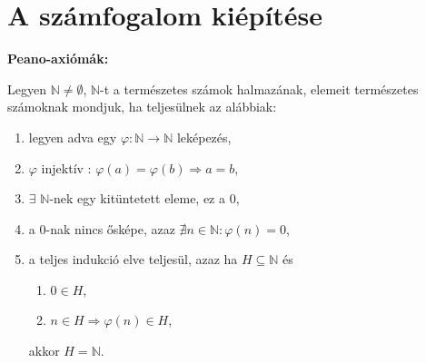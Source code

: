 \clearpage
\section{A számfogalom kiépítése}\label{sec-01-03}

\begin{blueBox}
  \bgroup
  \sffamily\bfseries Peano-axiómák:
  \egroup

  Legyen $ \mathbb N \neq \emptyset$, $\mathbb N$-t a természetes számok
  halmazának, elemeit természetes számoknak mondjuk, ha teljesülnek az alábbiak:
  \begin{enumerate}
    \item legyen adva egy $\varphi : \mathbb N \rightarrow \mathbb N$ leképezés,
    \item $\varphi$ injektív : $\varphi(a) = \varphi(b) \Rightarrow a = b$,
    \item $\exists$ $\mathbb N$-nek egy kitüntetett eleme, ez a $0$,
    \item a $0$-nak nincs ősképe, azaz $\nexists n \in \mathbb N : \varphi(n) =
          0$,
    \item a teljes indukció elve teljesül, azaz ha $H \subseteq \mathbb N$ és
          \begin{enumerate}
            \item $0 \in H$,
            \item $n \in H \Rightarrow \varphi(n) \in H$,
          \end{enumerate}
          akkor $H = \mathbb N$.
  \end{enumerate}
\end{blueBox}

